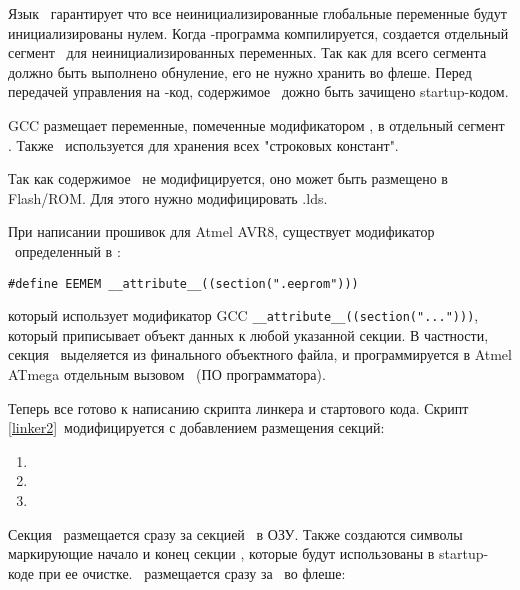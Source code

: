Язык \ci\ гарантирует что все неинициализированные глобальные переменные будут
инициализированы нулем. Когда
\ci-программа компилируется, создается отдельный сегмент \ для
неинициализированных переменных. Так как для всего сегмента должно быть
выполнено обнуление, его не нужно хранить во флеше. Перед передачей управления
на \ci-код, содержимое \ дожно быть зачищено startup-кодом.


GCC размещает переменные, помеченные модификатором , в отдельный
сегмент . Также \ используется для хранения всех
"строковых констант".

Так как содержимое \ не модифицируется, оно может быть размещено в
Flash/ROM. Для этого нужно модифицировать .lds.


При написании прошивок для Atmel AVR8, существует модификатор \
определенный в :

\begin{verbatim}
#define EEMEM __attribute__((section(".eeprom")))
\end{verbatim}

который использует модификатор GCC \verb|__attribute__((section("...")))|,
который приписывает объект данных к любой указанной секции. В частности, 
секция \var{.eeprom}\ выделяется из финального объектного файла, и
программируется в Atmel ATmega отдельным вызовом \var{avrdude}\ (ПО
программатора).


Теперь все готово к написанию скрипта линкера и стартового кода.
Скрипт \ref{linker2}\ модифицируется с добавлением размещения секций:

\begin{enumerate}[nosep]
  \item 
  \item 
  \item 
\end{enumerate}

Секция \ размещается сразу за секцией \ в ОЗУ. Также
создаются символы маркирующие начало и конец секции \var{.bss}, которые будут
использованы в startup-коде при ее очистке. \var{.rodata}\ размещается сразу
за \var{.text}\ во флеше:

